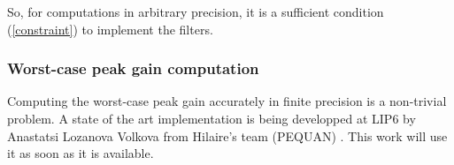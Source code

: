 		So, for computations in arbitrary precision, it is a sufficient condition (\ref{constraint}) to implement the filters.


		
		\subsubsection{Worst-case peak gain computation}
			Computing the worst-case peak gain accurately in finite precision is a non-trivial problem.
			A state of the art implementation is being developped at LIP6 by Anastatsi Lozanova Volkova from Hilaire's team (PEQUAN) \cite{Volk15a}.
			This work will use it as soon as it is available.











	





